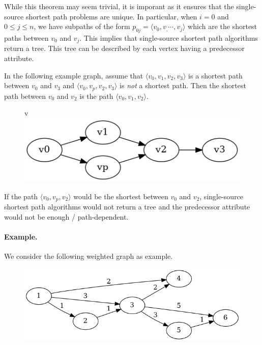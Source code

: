 While this theorem may seem trivial, it is imporant as it ensures that the single-source shortest path problems are unique. In particular, when $i=0$ and $0 \leq j \leq n$, we have subpaths of the form $p_{0j} = \langle v_0,v_,\cdots,v_j \rangle$ which are the shortest paths between $v_0$ and $v_j$. This implies that single-source shortest path algorithms return a tree. This tree can be described by each vertex having a predecessor attribute.   

In the following example graph, assume that $\langle v_0, v_1, v_2, v_3 \rangle$ is a shortest path between $v_0$ and $v_3$ and  $\langle v_0, v_p, v_2, v_3 \rangle$ is \emph{not} a shortest path. Then the shortest path between $v_0$ and $v_2$ is the path $\langle v_0, v_1, v_2 \rangle$.

\begin{figure}[H]v
\centering
\includegraphics[scale=0.5]{images/sssp_0.png}
\end{figure}

If the path $\langle v_0, v_p, v_2 \rangle$ would be the shortest between $v_0$ and $v_2$, single-source shortest path algorithms would not return a tree and the predecessor attribute would not be enough / path-dependent.


\paragraph{Example.} We consider the following weighted graph as example.


\begin{figure}[H]
\centering
\includegraphics[scale=0.5]{images/sssp_1.png}
\end{figure}


